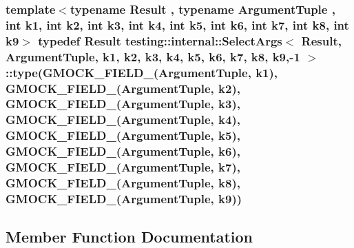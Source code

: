 \subsubsection[{\texorpdfstring{type}{type}}]{\setlength{\rightskip}{0pt plus 5cm}template$<$typename Result , typename Argument\+Tuple , int k1, int k2, int k3, int k4, int k5, int k6, int k7, int k8, int k9$>$ typedef Result {\bf testing\+::internal\+::\+Select\+Args}$<$ Result, Argument\+Tuple, k1, k2, k3, k4, k5, k6, k7, k8, k9,-\/1 $>$\+::type({\bf G\+M\+O\+C\+K\+\_\+\+F\+I\+E\+L\+D\+\_\+}(Argument\+Tuple, k1), {\bf G\+M\+O\+C\+K\+\_\+\+F\+I\+E\+L\+D\+\_\+}(Argument\+Tuple, k2), {\bf G\+M\+O\+C\+K\+\_\+\+F\+I\+E\+L\+D\+\_\+}(Argument\+Tuple, k3), {\bf G\+M\+O\+C\+K\+\_\+\+F\+I\+E\+L\+D\+\_\+}(Argument\+Tuple, k4), {\bf G\+M\+O\+C\+K\+\_\+\+F\+I\+E\+L\+D\+\_\+}(Argument\+Tuple, k5), {\bf G\+M\+O\+C\+K\+\_\+\+F\+I\+E\+L\+D\+\_\+}(Argument\+Tuple, k6), {\bf G\+M\+O\+C\+K\+\_\+\+F\+I\+E\+L\+D\+\_\+}(Argument\+Tuple, k7), {\bf G\+M\+O\+C\+K\+\_\+\+F\+I\+E\+L\+D\+\_\+}(Argument\+Tuple, k8), {\bf G\+M\+O\+C\+K\+\_\+\+F\+I\+E\+L\+D\+\_\+}(Argument\+Tuple, k9))}\hypertarget{classtesting_1_1internal_1_1_select_args_3_01_result_00_01_argument_tuple_00_01k1_00_01k2_00_01kbad6295bde1bc89afd5e3dfe4d52ae94_aa370f95245d998aea225e3f24f3b9208}{}\label{classtesting_1_1internal_1_1_select_args_3_01_result_00_01_argument_tuple_00_01k1_00_01k2_00_01kbad6295bde1bc89afd5e3dfe4d52ae94_aa370f95245d998aea225e3f24f3b9208}


\subsection{Member Function Documentation}

